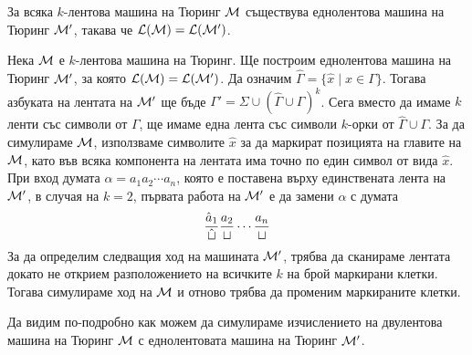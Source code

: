 \begin{important}
  \begin{proposition}
    За всяка $k$-лентова машина на Тюринг $\mathcal{M}$ съществува еднолентова машина на Тюринг $\mathcal{M}'$,
    такава че $\mathcal{L}(\mathcal{M}) = \mathcal{L}(\mathcal{M}')$.
  \end{proposition}  
\end{important}
\begin{hint}
  Нека $\mathcal{M}$ е $k$-лентова машина на Тюринг.
  Ще построим еднолентова машина на Тюринг $\mathcal{M}'$, за която $\mathcal{L}(\mathcal{M}) = \mathcal{L}(\mathcal{M}')$.
  Да означим $\hat\Gamma = \{\hat x \mid x \in \Gamma\}$.
  Тогава азбуката на лентата на $\mathcal{M}'$ ще бъде $\Gamma' = \Sigma \cup (\hat\Gamma \cup \Gamma)^{k}$.
  Сега вместо да имаме $k$ ленти със символи от $\Gamma$, ще имаме една лента със символи $k$-орки от $\hat\Gamma \cup \Gamma$.
  За да симулираме $\mathcal{M}$, използваме символите $\hat x$ за да маркират позицията на главите на $\mathcal{M}$,
  като във всяка компонента на лентата има точно по един символ от вида $\hat x$.
  При вход думата $\alpha = a_1a_2\cdots a_n$, която е поставена върху единствената лента на $\mathcal{M}'$, в случая на $k = 2$,
  първата работа на $\mathcal{M}'$ е да замени $\alpha$ с думата
  \[\frac{\hat{a}_1}{\hat{\sqcup}}\frac{a_2}{\sqcup}\cdots\frac{a_n}{\sqcup}\]
  За да определим следващия ход на машината $\mathcal{M}'$, трябва да сканираме лентата докато не 
  открием разположението на всичките $k$ на брой маркирани клетки. Тогава симулираме ход на $\mathcal{M}$
  и отново трябва да променим маркираните клетки.
\end{hint}

Да видим по-подробно как можем да симулираме изчислението на двулентова машина на Тюринг $\mathcal{M}$ с еднолентовата машина на Тюринг $\mathcal{M}'$.

